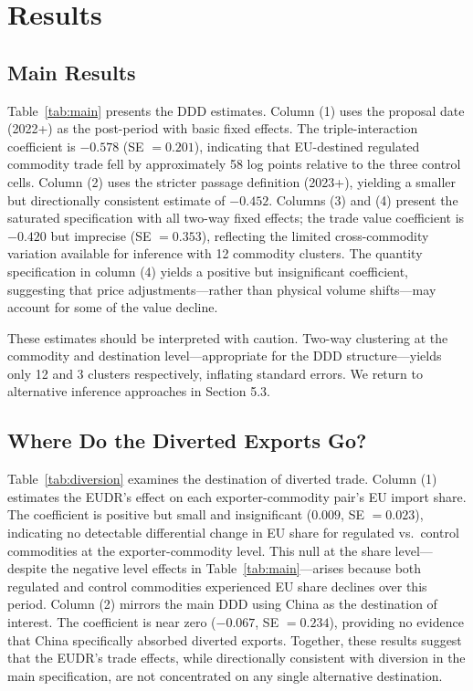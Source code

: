\documentclass[12pt]{article}
\begin{document}
\section{Results}

\subsection{Main Results}



Table~\ref{tab:main} presents the DDD estimates. Column (1) uses the proposal date (2022+) as the post-period with basic fixed effects. The triple-interaction coefficient is $-0.578$ (SE $= 0.201$), indicating that EU-destined regulated commodity trade fell by approximately 58 log points relative to the three control cells. Column (2) uses the stricter passage definition (2023+), yielding a smaller but directionally consistent estimate of $-0.452$. Columns (3) and (4) present the saturated specification with all two-way fixed effects; the trade value coefficient is $-0.420$ but imprecise (SE $= 0.353$), reflecting the limited cross-commodity variation available for inference with 12 commodity clusters. The quantity specification in column (4) yields a positive but insignificant coefficient, suggesting that price adjustments---rather than physical volume shifts---may account for some of the value decline.

These estimates should be interpreted with caution. Two-way clustering at the commodity and destination level---appropriate for the DDD structure---yields only 12 and 3 clusters respectively, inflating standard errors. We return to alternative inference approaches in Section 5.3.

\subsection{Where Do the Diverted Exports Go?}



Table~\ref{tab:diversion} examines the destination of diverted trade. Column (1) estimates the EUDR's effect on each exporter-commodity pair's EU import share. The coefficient is positive but small and insignificant ($0.009$, SE $= 0.023$), indicating no detectable differential change in EU share for regulated vs.\ control commodities at the exporter-commodity level. This null at the share level---despite the negative level effects in Table~\ref{tab:main}---arises because both regulated and control commodities experienced EU share declines over this period. Column (2) mirrors the main DDD using China as the destination of interest. The coefficient is near zero ($-0.067$, SE $= 0.234$), providing no evidence that China specifically absorbed diverted exports. Together, these results suggest that the EUDR's trade effects, while directionally consistent with diversion in the main specification, are not concentrated on any single alternative destination.
\end{document}
